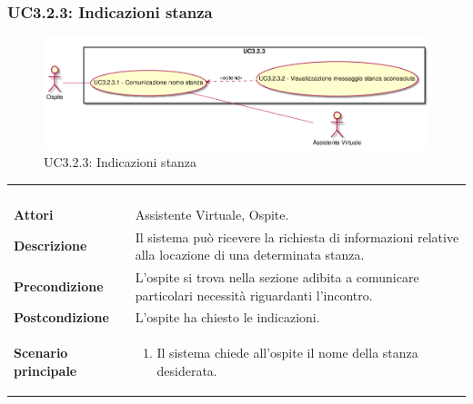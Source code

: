 \newpage\subsubsection{UC3.2.3: Indicazioni stanza}
\label{UC3.2.3}
\begin{figure}[h]
\centering
\includegraphics[width=\textwidth,height=\textheight,keepaspectratio]{images/UseCaseUC323.png}
\caption{UC3.2.3: Indicazioni stanza}
\end{figure}
\begin{longtable}{l|p{10cm}}
\rowcolor[gray]{0.8} \multicolumn{2}{c}{} \\
\rowcolor[gray]{0.8} \multicolumn{2}{c}{\textbf{UC3.2.3 - Indicazioni stanza}} \\
\rowcolor[gray]{0.8} \multicolumn{2}{c}{} \\
\hline
&\\
\textbf{Attori} & Assistente Virtuale, Ospite.\\[7pt]
\textbf{Descrizione} & Il sistema può ricevere la richiesta di informazioni relative alla locazione di una determinata stanza.\\[7pt]
\textbf{Precondizione} & L'ospite si trova nella sezione adibita a comunicare particolari necessità riguardanti l'incontro.\\[7pt]
\textbf{Postcondizione} & L'ospite ha chiesto le indicazioni.\\[7pt]
\textbf{Scenario principale} &\begin{enumerate}
\item  Il sistema chiede all'ospite il nome della stanza desiderata.
\end{enumerate}
\\[7pt]\hline
\end{longtable}


